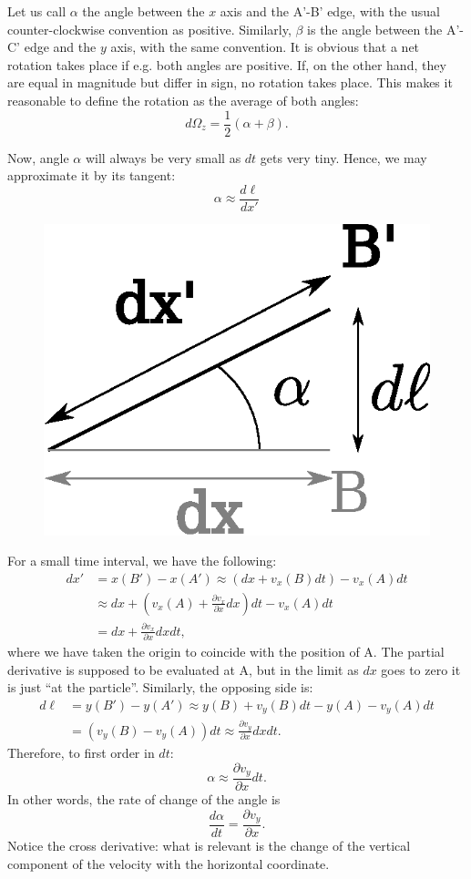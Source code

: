 Let us call $\alpha$ the angle between the $x$ axis and the A'-B'
edge, with the usual counter-clockwise convention as
positive. Similarly, $\beta$ is the angle between the A'-C' edge and
the $y$ axis, with the same convention. It is obvious that a net
rotation takes place if e.g. both angles are positive. If, on the
other hand, they are equal in magnitude but differ in sign, no
rotation takes place. This makes it reasonable to define the
rotation as the average of both angles:
\[
d\Omega_z = \frac12
\left(
        \alpha + \beta
\right) .
\]

Now, angle $\alpha$ will always be very small as $dt$ gets very
tiny. Hence, we may approximate it by its tangent:
\[
\alpha \approx \frac{d\ell}{dx'}
\]



\begin{figure}
  \centering
  \includegraphics[width=0.4\linewidth]{figures/particle1}
  \caption{\label{fig:particle1}}
\end{figure}

For a small time interval, we have the following:
\begin{align*}
	dx' & =
	  x(B')-x(A') \approx
	 (dx+v_x(B) dt) - v_x(A) dt  \\
	& \approx
	dx+
	\left(
	v_x(A) +
	\frac{\partial v_x}{\partial x} dx
	\right ) dt - v_x(A) dt \\
	& = dx + \frac{\partial v_x}{\partial x} dx dt ,
\end{align*}
where we have taken the origin to coincide with the position of A. The
partial derivative is supposed to be evaluated at A, but in the limit
as $dx$ goes to zero it is just ``at the particle''. Similarly, the opposing
side is:
%
\begin{align*}
d\ell & = y(B')-y(A') \approx
y(B) + 
v_y(B) dt
-
y(A) - 
v_y(A) dt \\
& =
\left(
v_y(B) - v_y(A) 
\right) dt 
 \approx
\frac{\partial v_y}{\partial x} dx dt
.
\end{align*}
%
Therefore, to first order in $dt$:
\[
\alpha \approx \frac{\partial v_y}{\partial x}  dt .
\]
In other words, the rate of change of the angle is
\[
\frac{d \alpha}{dt} = \frac{\partial v_y}{\partial x}  .
\]
Notice the cross derivative: what is relevant is the change of the
vertical component of the velocity with the horizontal coordinate.

